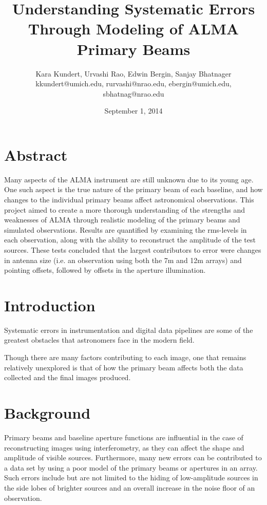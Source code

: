 \documentclass[11pt]{article}
\makeatletter
\newcommand{\thetitle}{Understanding Systematic Errors Through Modeling of ALMA 
Primary Beams}
\newcommand{\theauthor}{Kara Kundert, Urvashi Rao, Edwin Bergin, Sanjay 
Bhatnager}
\newcommand{\theauthorsemail}{kkundert@umich.edu, rurvashi@nrao.edu, 
ebergin@umich.edu, sbhatnag@nrao.edu}
\newcommand{\thedate}{September 1, 2014}
\makeatother
\begin{document}
\title{
    \sffamily\bfseries\huge
    \thetitle \\
}
\author{
    \sffamily\theauthor \\
    \sffamily\theauthorsemail \\
}
\date{\thedate}
\maketitle
\sloppy

\section{Abstract}

Many aspects of the ALMA instrument are still unknown due to its young age.
One such aspect is the true nature of the primary beam of each baseline, and
how changes to the individual primary beams affect astronomical
observations. This project aimed to create a more thorough
understanding of the strengths and weaknesses of ALMA through realistic
modeling of the primary beams and simulated observations. Results are
quantified by examining the rms-levels in each observation, along with the
ability to reconstruct the amplitude of the test sources. These tests
concluded that the largest contributors to error were changes in antenna
size (i.e. an observation using both the 7m and 12m arrays) and pointing
offsets, followed by offsets in the aperture illumination.

\section{Introduction}

Systematic errors in instrumentation and digital data pipelines are some of the 
greatest obstacles that astronomers face in the modern field. 

Though there are many factors contributing to each image, one that remains 
relatively unexplored is that of how the primary beam affects both the data 
collected and the final images produced.

\section{Background}

Primary beams and baseline aperture functions are influential in the case of
reconstructing images using interferometry, as they can affect the shape and
amplitude of visible sources. Furthermore, many new errors can be
contributed to a data set by using a poor model of the primary beams or
apertures in an array. Such errors include but are not limited to the hiding of 
low-amplitude
sources in the side lobes of brighter sources and an overall increase in the
noise floor of an observation.
\end{document}
